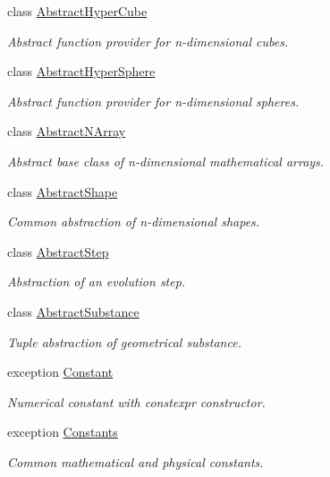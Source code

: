 \begin{DoxyCompactItemize}
class \hyperlink{classmagrathea_1_1AbstractHyperCube}{Abstract\-Hyper\-Cube}
\begin{DoxyCompactList}\small\item\em Abstract function provider for n-\/dimensional cubes. \end{DoxyCompactList}\item 
class \hyperlink{classmagrathea_1_1AbstractHyperSphere}{Abstract\-Hyper\-Sphere}
\begin{DoxyCompactList}\small\item\em Abstract function provider for n-\/dimensional spheres. \end{DoxyCompactList}\item 
class \hyperlink{classmagrathea_1_1AbstractNArray}{Abstract\-N\-Array}
\begin{DoxyCompactList}\small\item\em Abstract base class of n-\/dimensional mathematical arrays. \end{DoxyCompactList}\item 
class \hyperlink{classmagrathea_1_1AbstractShape}{Abstract\-Shape}
\begin{DoxyCompactList}\small\item\em Common abstraction of n-\/dimensional shapes. \end{DoxyCompactList}\item 
class \hyperlink{classmagrathea_1_1AbstractStep}{Abstract\-Step}
\begin{DoxyCompactList}\small\item\em Abstraction of an evolution step. \end{DoxyCompactList}\item 
class \hyperlink{classmagrathea_1_1AbstractSubstance}{Abstract\-Substance}
\begin{DoxyCompactList}\small\item\em Tuple abstraction of geometrical substance. \end{DoxyCompactList}\item 
exception \hyperlink{exceptionmagrathea_1_1Constant}{Constant}
\begin{DoxyCompactList}\small\item\em Numerical constant with constexpr constructor. \end{DoxyCompactList}\item 
exception \hyperlink{exceptionmagrathea_1_1Constants}{Constants}
\begin{DoxyCompactList}\small\item\em Common mathematical and physical constants. \end{DoxyCompactList}\item 

\end{DoxyCompactItemize}
